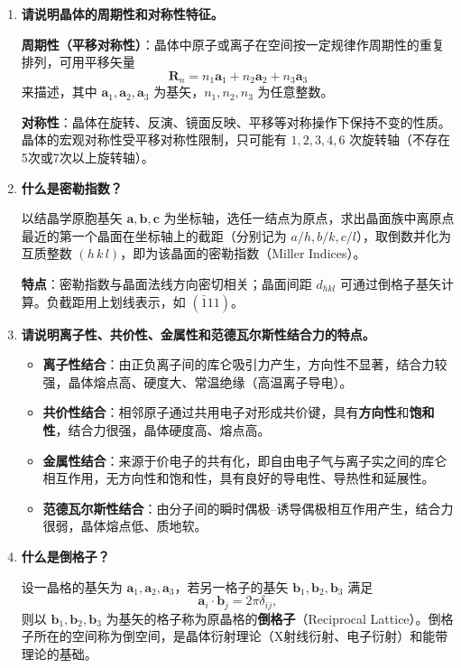 \begin{enumerate}[label=\textbf{\arabic*.}, leftmargin=2em, itemsep=0.8em]
\item \textbf{请说明晶体的周期性和对称性特征。}

\textbf{周期性（平移对称性）}：晶体中原子或离子在空间按一定规律作周期性的重复排列，可用平移矢量
\[
    \mathbf{R}_n = n_1\mathbf{a}_1 + n_2\mathbf{a}_2 + n_3\mathbf{a}_3
\]
来描述，其中 $\mathbf{a}_1, \mathbf{a}_2, \mathbf{a}_3$ 为基矢，$n_1, n_2, n_3$ 为任意整数。

\textbf{对称性}：晶体在旋转、反演、镜面反映、平移等对称操作下保持不变的性质。晶体的宏观对称性受平移对称性限制，只可能有 $1, 2, 3, 4, 6$ 次旋转轴（不存在5次或7次以上旋转轴）。

\item \textbf{什么是密勒指数？}

以结晶学原胞基矢 $\mathbf{a}, \mathbf{b}, \mathbf{c}$ 为坐标轴，选任一结点为原点，求出晶面族中离原点最近的第一个晶面在坐标轴上的截距（分别记为 $a/h, b/k, c/l$），取倒数并化为互质整数 $(h\,k\,l)$，即为该晶面的密勒指数（Miller Indices）。

\textbf{特点}：密勒指数与晶面法线方向密切相关；晶面间距 $d_{hkl}$ 可通过倒格子基矢计算。负截距用上划线表示，如 $(\bar{1}11)$。

\item \textbf{请说明离子性、共价性、金属性和范德瓦尔斯性结合力的特点。}

\begin{itemize}[nosep]
    \item \textbf{离子性结合}：由正负离子间的库仑吸引力产生，方向性不显著，结合力较强，晶体熔点高、硬度大、常温绝缘（高温离子导电）。
    \item \textbf{共价性结合}：相邻原子通过共用电子对形成共价键，具有\textbf{方向性}和\textbf{饱和性}，结合力很强，晶体硬度高、熔点高。
    \item \textbf{金属性结合}：来源于价电子的共有化，即自由电子气与离子实之间的库仑相互作用，无方向性和饱和性，具有良好的导电性、导热性和延展性。
    \item \textbf{范德瓦尔斯性结合}：由分子间的瞬时偶极--诱导偶极相互作用产生，结合力很弱，晶体熔点低、质地软。
\end{itemize}

\item \textbf{什么是倒格子？}

设一晶格的基矢为 $\mathbf{a}_1, \mathbf{a}_2, \mathbf{a}_3$，若另一格子的基矢 $\mathbf{b}_1, \mathbf{b}_2, \mathbf{b}_3$ 满足
\[
    \mathbf{a}_i \cdot \mathbf{b}_j = 2\pi\delta_{ij},
\]
则以 $\mathbf{b}_1, \mathbf{b}_2, \mathbf{b}_3$ 为基矢的格子称为原晶格的\textbf{倒格子}（Reciprocal Lattice）。倒格子所在的空间称为倒空间，是晶体衍射理论（X射线衍射、电子衍射）和能带理论的基础。


\end{enumerate}
